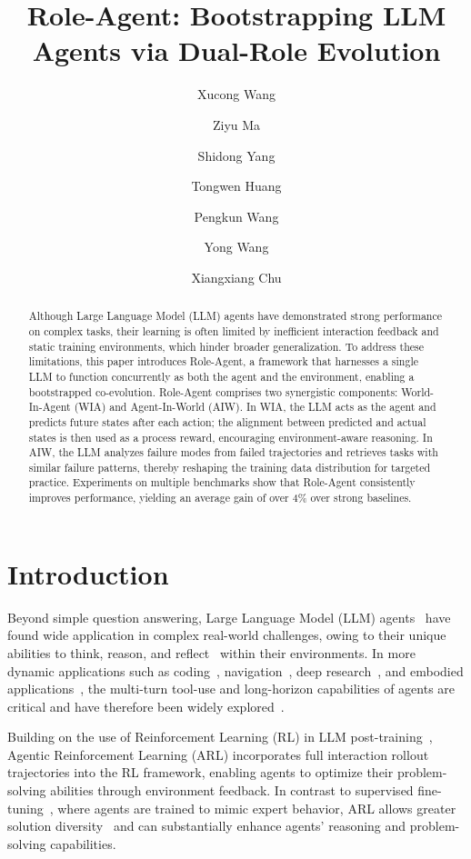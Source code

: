 \documentclass{llmxive}
\title{Role-Agent: Bootstrapping LLM Agents via Dual-Role Evolution}
\author{Xucong Wang \and Ziyu Ma \and Shidong Yang \and Tongwen Huang \and Pengkun Wang \and Yong Wang \and Xiangxiang Chu}
\begin{document}
\maketitle
\begin{abstract}
Although Large Language Model (LLM) agents have demonstrated strong performance on complex tasks, their learning is often limited by inefficient interaction feedback and static training environments, which hinder broader generalization. To address these limitations, this paper introduces Role-Agent, a framework that harnesses a single LLM to function concurrently as both the agent and the environment, enabling a bootstrapped co-evolution. Role-Agent comprises two synergistic components: World-In-Agent (WIA) and Agent-In-World (AIW). In WIA, the LLM acts as the agent and predicts future states after each action; the alignment between predicted and actual states is then used as a process reward, encouraging environment-aware reasoning. In AIW, the LLM analyzes failure modes from failed trajectories and retrieves tasks with similar failure patterns, thereby reshaping the training data distribution for targeted practice. Experiments on multiple benchmarks show that Role-Agent consistently improves performance, yielding an average gain of over 4\% over strong baselines.
\end{abstract}
\section{Introduction}
Beyond simple question answering, Large Language Model (LLM) agents~\cite{team2023gemini,yang2025qwen3,chen2025large,ou2025automind,ma2026skillclaw} have found wide application in complex real-world challenges, owing to their unique abilities to think, reason, and reflect~\cite{yao2022react,shinn2023reflexion,liu2023agentbench,dong2025tool} within their environments. In more dynamic applications such as coding~\cite{jiang2025aide}, navigation~\cite{comanici2025gemini}, deep research~\cite{citron2024try,team2025tongyi}, and embodied applications~\cite{shridhar2020alfworld}, the multi-turn tool-use and long-horizon capabilities of agents are critical and have therefore been widely explored~\cite{liu2023agentbench,dong2025agentic}.

 
Building on the use of Reinforcement Learning (RL) in LLM post-training~\cite{schulman2017proximal,rafailov2023direct,chu2025gpg}, Agentic Reinforcement Learning (ARL) incorporates full interaction rollout trajectories into the RL framework, enabling agents to optimize their problem-solving abilities through environment feedback. In contrast to supervised fine-tuning~\cite{zhang2024you}, where agents are trained to mimic expert behavior, ARL allows greater solution diversity~\cite{guo2025deepseek} and can substantially enhance agents' reasoning and problem-solving capabilities.
 
\end{document}
